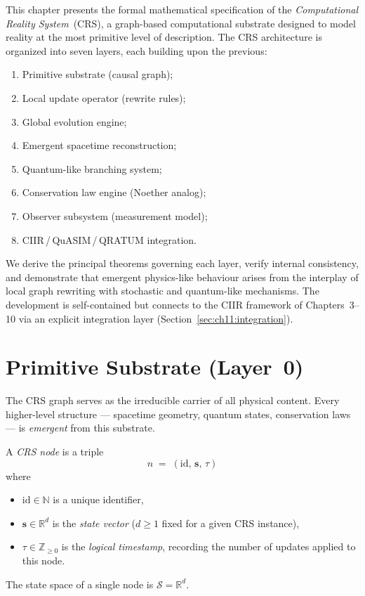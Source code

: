 \vspace{0.5em}
\noindent
This chapter presents the formal mathematical specification of the
\emph{Computational Reality System}~(CRS), a graph-based computational
substrate designed to model reality at the most primitive level of
description.  The CRS architecture is organized into seven layers,
each building upon the previous:
\begin{enumerate}
  \item[\textbf{L0.}] Primitive substrate (causal graph);
  \item[\textbf{L1.}] Local update operator (rewrite rules);
  \item[\textbf{L2.}] Global evolution engine;
  \item[\textbf{L3.}] Emergent spacetime reconstruction;
  \item[\textbf{L4.}] Quantum-like branching system;
  \item[\textbf{L5.}] Conservation law engine (Noether analog);
  \item[\textbf{L6.}] Observer subsystem (measurement model);
  \item[\textbf{L7.}] CIIR\,/\,QuASIM\,/\,QRATUM integration.
\end{enumerate}
We derive the principal theorems governing each layer, verify internal
consistency, and demonstrate that emergent physics-like behaviour
arises from the interplay of local graph rewriting with stochastic and
quantum-like mechanisms.  The development is self-contained but
connects to the CIIR framework of Chapters~3--10 via an explicit
integration layer (Section~\ref{sec:ch11:integration}).

\section{Primitive Substrate (Layer~0)}
\label{sec:ch11:substrate}

The CRS graph serves as the irreducible carrier of all physical
content.  Every higher-level structure --- spacetime geometry, quantum
states, conservation laws --- is \emph{emergent} from this substrate.

\begin{definition}
\label{def:11.1}
A \emph{CRS node} is a triple
\[
  n \;=\; (\mathrm{id},\, \mathbf{s},\, \tau)
\]
where
\begin{itemize}
  \item $\mathrm{id} \in \mathbb{N}$ is a unique identifier,
  \item $\mathbf{s} \in \mathbb{R}^d$ is the \emph{state vector}
        ($d \geq 1$ fixed for a given CRS instance),
  \item $\tau \in \mathbb{Z}_{\geq 0}$ is the \emph{logical timestamp},
        recording the number of updates applied to this node.
\end{itemize}
The state space of a single node is $\mathcal{S} = \mathbb{R}^d$.
\end{definition}

